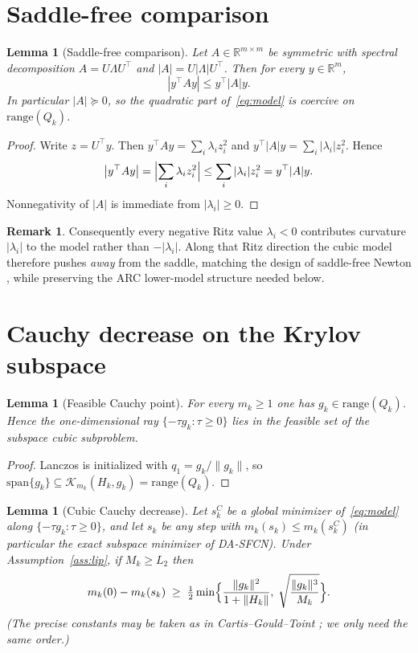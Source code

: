 \documentclass[11pt,a4paper]{article}
\newtheorem{lemma}[theorem]{Lemma}
\theoremstyle{definition}
\newtheorem{remark}[theorem]{Remark}
\begin{document}
\section{Saddle-free comparison}
\begin{lemma}[Saddle-free comparison]\label{lem:sf}
Let $A\in\mathbb{R}^{m\times m}$ be symmetric with spectral decomposition
$A=U\Lambda U^\top$ and $|A|=U|\Lambda|U^\top$. Then for every $y\in\mathbb{R}^m$,
\[
|y^\top A y|\le y^\top |A| y.
\]
In particular $|A|\succeq 0$, so the quadratic part of~\eqref{eq:model} is
coercive on $\mathrm{range}(Q_k)$.
\end{lemma}

\begin{proof}
Write $z=U^\top y$. Then
$y^\top A y=\sum_i \lambda_i z_i^2$ and
$y^\top |A| y=\sum_i |\lambda_i| z_i^2$.
Hence
\[
\bigl|y^\top A y\bigr|
=
\Bigl|\sum_i \lambda_i z_i^2\Bigr|
\le
\sum_i |\lambda_i| z_i^2
=
y^\top |A| y.
\]
Nonnegativity of $|A|$ is immediate from $|\lambda_i|\ge 0$.
\end{proof}

\begin{remark}
Consequently every negative Ritz value $\lambda_i<0$ contributes curvature
$|\lambda_i|$ to the model rather than $-|\lambda_i|$. Along that Ritz
direction the cubic model therefore pushes \emph{away} from the saddle,
matching the design of saddle-free Newton \cite{dauphin2014}, while
preserving the ARC lower-model structure needed below.
\end{remark}

\section{Cauchy decrease on the Krylov subspace}
\begin{lemma}[Feasible Cauchy point]\label{lem:cauchy}
For every $m_k\ge 1$ one has $g_k\in\mathrm{range}(Q_k)$. Hence the
one-dimensional ray $\{-\tau g_k:\tau\ge 0\}$ lies in the feasible set of
the subspace cubic subproblem.
\end{lemma}

\begin{proof}
Lanczos is initialized with $q_1=g_k/\|g_k\|$, so
$\mathrm{span}\{g_k\}\subseteq\mathcal{K}_{m_k}(H_k,g_k)=\mathrm{range}(Q_k)$.
\end{proof}

\begin{lemma}[Cubic Cauchy decrease]\label{lem:dec}
Let $s_k^C$ be a global minimizer of~\eqref{eq:model} along
$\{-\tau g_k:\tau\ge 0\}$, and let $s_k$ be any step with
$m_k(s_k)\le m_k(s_k^C)$ (in particular the exact subspace minimizer of
DA-SFCN). Under Assumption~\ref{ass:lip}, if $M_k\ge L_2$ then
\[
m_k(0)-m_k(s_k)
\;\ge\;
\tfrac12\min\Bigl\{
\frac{\|g_k\|^2}{1+\|H_k\|},\;
\sqrt{\frac{\|g_k\|^3}{M_k}}
\Bigr\}.
\]
(The precise constants may be taken as in Cartis--Gould--Toint
\cite[Lem.\ 2.1]{cartis2011}; we only need the same order.)
\end{lemma}
\end{document}
